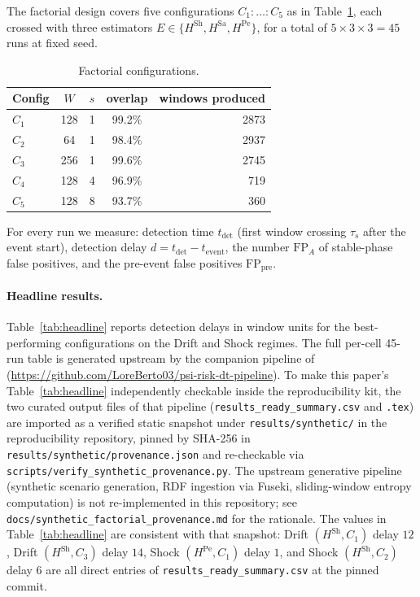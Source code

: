 \documentclass[runningheads]{llncs}
\newcommand{\Hsh}{\ensuremath{H^{\mathrm{Sh}}}}
\newcommand{\Hsa}{\ensuremath{H^{\mathrm{Sa}}}}
\newcommand{\Hpe}{\ensuremath{H^{\mathrm{Pe}}}}
\newcommand{\taus}{\ensuremath{\tau_{s}}}
\begin{document}
The factorial design covers five configurations $C_1{:}\ldots{:}C_5$ as
in Table~\ref{tab:configs}, each crossed with three estimators
$E \in \{\Hsh, \Hsa, \Hpe\}$, for a total of $5 \times 3 \times 3 = 45$
runs at fixed seed.

\begin{table}[t]
\centering
\caption{Factorial configurations.}
\label{tab:configs}
\small
\begin{tabular}{@{}lcccr@{}}
\toprule
Config & $W$ & $s$ & overlap & windows produced \\
\midrule
$C_1$ & 128 & 1 & 99.2\% & 2873 \\
$C_2$ &  64 & 1 & 98.4\% & 2937 \\
$C_3$ & 256 & 1 & 99.6\% & 2745 \\
$C_4$ & 128 & 4 & 96.9\% & 719 \\
$C_5$ & 128 & 8 & 93.7\% & 360 \\
\bottomrule
\end{tabular}
\end{table}

For every run we measure: detection time $t_{\mathrm{det}}$ (first
window crossing $\taus$ after the event start), detection delay
$d = t_{\mathrm{det}} - t_{\mathrm{event}}$, the number $\mathrm{FP}_A$
of stable-phase false positives, and the pre-event false positives
$\mathrm{FP}_{\mathrm{pre}}$.

\paragraph{Headline results.} Table~\ref{tab:headline} reports detection
delays in window units for the best-performing configurations on the
Drift and Shock regimes. The full per-cell 45-run table is generated
upstream by the companion pipeline of~\cite{berto2026}
(\url{https://github.com/LoreBerto03/psi-risk-dt-pipeline}). To make
this paper's Table~\ref{tab:headline} independently checkable inside
the reproducibility kit, the two curated output files of that pipeline
(\texttt{results\_ready\_summary.csv} and \texttt{.tex}) are imported
as a verified static snapshot under
\texttt{results/synthetic/} in the reproducibility repository, pinned
by SHA-256 in \texttt{results/synthetic/provenance.json} and
re-checkable via \texttt{scripts/verify\_synthetic\_provenance.py}.
The upstream generative pipeline (synthetic scenario generation, RDF
ingestion via Fuseki, sliding-window entropy computation) is not
re-implemented in this repository; see
\texttt{docs/synthetic\_factorial\_provenance.md} for the rationale.
The values in Table~\ref{tab:headline} are consistent with that
snapshot: Drift $(\Hsh, C_1)$ delay $12$, Drift $(\Hsh, C_3)$ delay $14$,
Shock $(\Hpe, C_1)$ delay $1$, and Shock $(\Hsh, C_2)$ delay $6$ are all
direct entries of \texttt{results\_ready\_summary.csv} at the pinned
commit.
\end{document}
